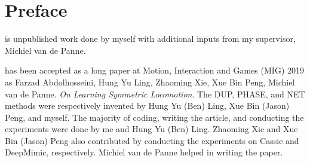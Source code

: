 
\chapter{Preface}

 is unpublished work done by myself with additional inputs from my supervisor, Michiel van de Panne.

 has been accepted as a long paper at Motion, Interaction and Games (MIG) 2019 as Farzad Abdolhosseini, Hung Yu Ling, Zhaoming Xie, Xue Bin Peng, Michiel van de Panne. \textit{On Learning Symmetric Locomotion}. The DUP, PHASE, and NET methods were respectively invented by Hung Yu (Ben) Ling, Xue Bin (Jason) Peng, and myself. The majority of coding, writing the article, and conducting the experiments were done by me and Hung Yu (Ben) Ling. Zhaoming Xie and Xue Bin (Jason) Peng also contributed by conducting the experiments on Cassie and DeepMimic, respectively. Michiel van de Panne helped in writing the paper.
